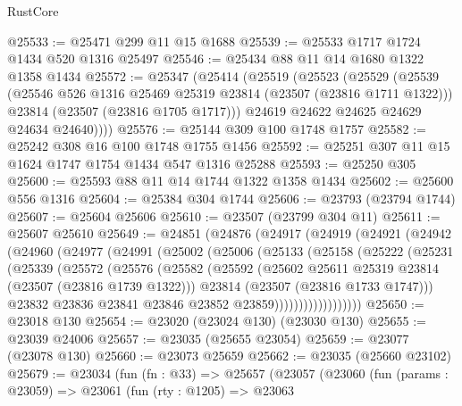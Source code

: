 \begin{lexlean}{RustCore}
\begin{coremodule}
@25533 := @25471 @299 @11 @15 @1688
@25539 := @25533 @1717 @1724 @1434 @520 @1316 @25497
@25546 := @25434 @88 @11 @14 @1680 @1322 @1358 @1434
@25572 := @25347
    (@25414
      (@25519
        (@25523
          (@25529
            (@25539
              (@25546 @526 @1316 @25469 @25319 @23814 (@23507 (@23816 @1711 @1322)))
              @23814
              (@23507 (@23816 @1705 @1717)))
            @24619
            @24622
            @24625
            @24629
            @24634
            @24640))))
@25576 := @25144 @309 @100 @1748 @1757
@25582 := @25242 @308 @16 @100 @1748 @1755 @1456
@25592 := @25251 @307 @11 @15 @1624 @1747 @1754 @1434 @547 @1316 @25288
@25593 := @25250 @305
@25600 := @25593 @88 @11 @14 @1744 @1322 @1358 @1434
@25602 := @25600 @556 @1316
@25604 := @25384 @304 @1744
@25606 := @23793 (@23794 @1744)
@25607 := @25604 @25606
@25610 := @23507 (@23799 @304 @11)
@25611 := @25607 @25610
@25649 := @24851
    (@24876
      (@24917
        (@24919
          (@24921
            (@24942
              (@24960
                (@24977
                  (@24991
                    (@25002
                      (@25006
                        (@25133
                          (@25158
                            (@25222
                              (@25231
                                (@25339
                                  (@25572
                                    (@25576
                                      (@25582
                                        (@25592
                                          (@25602
                                            @25611
                                            @25319
                                            @23814
                                            (@23507 (@23816 @1739 @1322)))
                                          @23814
                                          (@23507 (@23816 @1733 @1747)))
                                        @23832
                                        @23836
                                        @23841
                                        @23846
                                        @23852
                                        @23859))))))))))))))))))
@25650 := @23018 @130
@25654 := @23020 (@23024 @130) (@23030 @130)
@25655 := @23039 @24006
@25657 := @23035 (@25655 @23054)
@25659 := @23077 (@23078 @130)
@25660 := @23073 @25659
@25662 := @23035 (@25660 @23102)
@25679 := @23034
    (fun (fn : @33) =>
    @25657
      (@23057
        (@23060
          (fun (params : @23059) =>
          @23061
            (fun (rty : @1205) =>
            @23063

\end{coremodule}
\end{lexlean}
